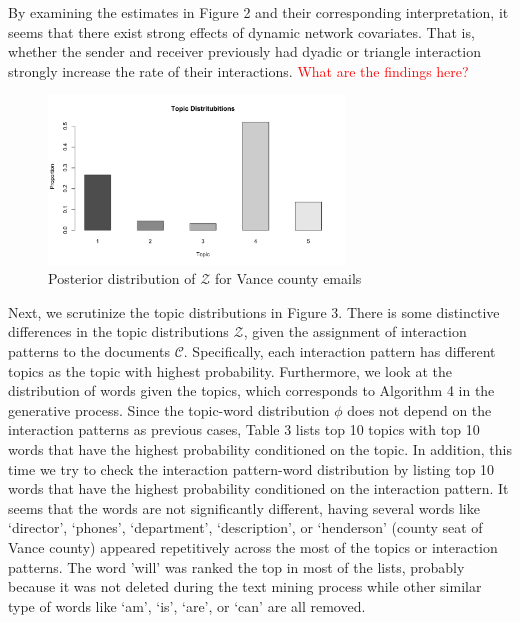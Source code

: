\documentclass[a4paper]{article}
\begin{document}
 \normalsize
By examining the estimates in Figure 2 and their corresponding interpretation, it seems that there exist strong effects of dynamic network covariates. That is, whether the sender and receiver previously had dyadic or triangle interaction strongly increase the rate of their interactions. \textcolor{red}{What are the findings here?}\newpage
 \begin{figure}[ht]
 	\centering
 		\includegraphics[width=0.7\textwidth]{topicplot.pdf} 
 	\caption{Posterior distribution of $\mathcal{Z}$ for Vance county emails}
 	\label{fig:Vancebarplot}
 \end{figure} 
\noindent Next, we scrutinize the topic distributions in Figure 3. There is some distinctive differences in the topic distributions $\mathcal{Z}$, given the assignment of interaction patterns to the documents $\mathcal{C}$. Specifically, each interaction pattern has different topics as the topic with highest probability.
 \normalsize
 \newline
 Furthermore, we look at the distribution of words given the topics, which corresponds to Algorithm 4 in the generative process. Since the topic-word distribution $\phi$ does not depend on the interaction patterns as previous cases, Table 3 lists top 10 topics with top 10 words that have the highest probability conditioned on the topic. In addition, this time we try to check the interaction pattern-word distribution by listing top 10 words that have the highest probability conditioned on the interaction pattern. It seems that the words are not significantly different, having several words like `director', `phones', `department', `description', or `henderson' (county seat of Vance county) appeared repetitively across the most of the topics or interaction patterns. The word 'will' was ranked the top in most of the lists, probably because it was not deleted during the text mining process while other similar type of words like `am', `is', `are', or `can' are all removed. \\
\end{document}
